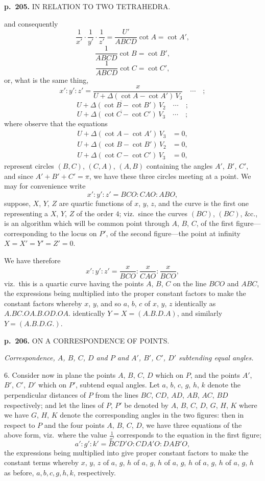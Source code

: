 \documentclass[11pt,a4paper]{book}
\begin{document}
\clearpage

\noindent
\textbf{p.~205.}  IN RELATION TO TWO TETRAHEDRA.

and consequently
\[
\frac{1}{x'} \cdot \frac{1}{y'} \cdot \frac{1}{z'} = \frac{U'}{ABCD}\cot A = \cot A',
\]
\[
\frac{1}{ABCD}\cot B = \cot B',
\]
\[
\frac{1}{ABCD}\cot C = \cot C',
\]
or, what is the same thing,
\[
x' : y' : z' = \frac{x}{U + \Delta(\cot A - \cot A')\,V_3} \quad \cdots \quad ;
\]
\[
\overline{U + \Delta(\cot B - \cot B')\,V_2} \quad \cdots \quad ;
\]
\[
\overline{U + \Delta(\cot C - \cot C')\,V_3} \quad \cdots \quad ;
\]
where observe that the equations
\begin{align*}
U + \Delta(\cot A - \cot A')\,V_3 &= 0, \\
U + \Delta(\cot B - \cot B')\,V_2 &= 0, \\
U + \Delta(\cot C - \cot C')\,V_3 &= 0,
\end{align*}
represent circles $(B, C)$, $(C, A)$, $(A, B)$ containing the angles $A'$, $B'$, $C'$, and since $A' + B' + C' = \pi$, we have these three circles meeting at a point.  We may for convenience write
\[
x' : y' : z' = BCO : CAO : ABO,
\]
suppose, $X$, $Y$, $Z$ are quartic functions of $x$, $y$, $z$, and the curve is the first one representing a $X$, $Y$, $Z$ of the order $4$; viz.\ since the curves $(BC)$, $(BC)$, \&c., is an algorithm which will be common point through $A$, $B$, $C$, of the first figure---corresponding to the locus on $P'$, of the second figure---the point at infinity $X = X' = Y' = Z' = 0$.

We have therefore
\[
x' : y' : z' = \frac{x}{BCO} : \frac{x}{CAO} : \frac{x}{BCO},
\]
viz.\ this is a quartic curve having the points $A$, $B$, $C$ on the line $BCO$ and $ABC$, the expressions being multiplied into the proper constant factors to make the constant factors whereby $x$, $y$, and so $a$, $b$, $c$ of $x$, $y$, $z$ identically as $A.BC.OA.B.OD.OA.$ identically $Y = X = (A.B.D.A)$, and similarly $Y = (A.B.D.G.)$.

\clearpage

\noindent
\textbf{p.~206.}  ON A CORRESPONDENCE OF POINTS.

\textit{Correspondence, $A$, $B$, $C$, $D$ and $P$ and $A'$, $B'$, $C'$, $D'$ subtending equal angles.}

6. Consider now in plane the points $A$, $B$, $C$, $D$ which on $P$, and the points $A'$, $B'$, $C'$, $D'$ which on $P'$, subtend equal angles. Let $a$, $b$, $c$, $g$, $h$, $k$ denote the perpendicular distances of $P$ from the lines $BC$, $CD$, $AD$, $AB$, $AC$, $BD$ respectively; and let the lines of $P$, $P'$ be denoted by $A$, $B$, $C$, $D$, $G$, $H$, $K$ where we have $G$, $H$, $K$ denote the corresponding angles in the two figures: then in respect to $P$ and the four points $A$, $B$, $C$, $D$, we have three equations of the above form, viz.\ where the value $\frac{1}{x'}$ corresponds to the equation in the first figure;
\[
a' : g' : k' = BCD'O : CDA'O : DAB'O,
\]
the expressions being multiplied into give proper constant factors to make the constant terms whereby $x$, $y$, $z$ of $a$, $g$, $h$ of $a$, $g$, $h$ of $a$, $g$, $h$ of $a$, $g$, $h$ of $a$, $g$, $h$ as before, $a, b, c, g, h, k$, respectively.
\end{document}
